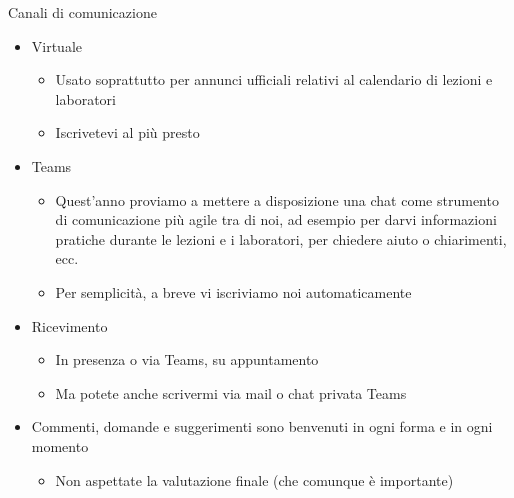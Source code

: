 \begin{frame}{Canali di comunicazione}

  \begin{itemize}[<+->]
  \item Virtuale

    \begin{itemize}[<.->]
    \item Usato soprattutto per annunci ufficiali relativi al calendario di
      lezioni e laboratori
    \item Iscrivetevi al più presto
    \end{itemize}
    
  \item Teams

    \begin{itemize}[<.->]
    \item Quest'anno proviamo a mettere a disposizione una chat come strumento
      di comunicazione più agile tra di noi, ad esempio per darvi informazioni
      pratiche durante le lezioni e i laboratori, per chiedere aiuto o
      chiarimenti, ecc.
    \item Per semplicità, a breve vi iscriviamo noi automaticamente
    \end{itemize}

  \item Ricevimento

    \begin{itemize}[<.->]
    \item In presenza o via Teams, su appuntamento
    \item Ma potete anche scrivermi via mail o chat privata Teams
    \end{itemize}
    
  \item Commenti, domande e suggerimenti sono benvenuti in ogni forma e in ogni
    momento
    \begin{itemize}[<.->]
    \item Non aspettate la valutazione finale (che comunque è importante)
    \end{itemize}

  \end{itemize}
  
\end{frame}

